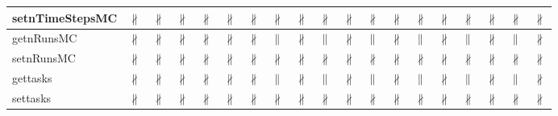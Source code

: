\documentclass[10pt]{article}
\begin{document}
\begin{longtable}{|l|l|l|l|l|l|l|l|l|l|l|l|l|l|l|l|l|l|l|}
\hline
setnTimeStepsMC&{\color{BrickRed}$\nparallel$}&{\color{BrickRed}$\nparallel$}&{\color{BrickRed}$\nparallel$}&{\color{BrickRed}$\nparallel$}&{\color{BrickRed}$\nparallel$}&{\color{BrickRed}$\nparallel$}&{\color{BrickRed}$\nparallel$}&{\color{BrickRed}$\nparallel$}&{\color{BrickRed}$\nparallel$}&{\color{BrickRed}$\nparallel$}&{\color{BrickRed}$\nparallel$}&{\color{BrickRed}$\nparallel$}&{\color{BrickRed}$\nparallel$}&{\color{BrickRed}$\nparallel$}&{\color{BrickRed}$\nparallel$}&{\color{BrickRed}$\nparallel$}&{\color{BrickRed}$\nparallel$}&{\color{BrickRed}$\nparallel$}\\
\hline
getnRunsMC&{\color{BrickRed}$\nparallel$}&{\color{BrickRed}$\nparallel$}&{\color{BrickRed}$\nparallel$}&{\color{BrickRed}$\nparallel$}&{\color{BrickRed}$\nparallel$}&{\color{BrickRed}$\nparallel$}&{\color{blue}$\parallel$}&{\color{BrickRed}$\nparallel$}&{\color{blue}$\parallel$}&{\color{BrickRed}$\nparallel$}&{\color{blue}$\parallel$}&{\color{BrickRed}$\nparallel$}&{\color{blue}$\parallel$}&{\color{BrickRed}$\nparallel$}&{\color{blue}$\parallel$}&{\color{BrickRed}$\nparallel$}&{\color{blue}$\parallel$}&{\color{BrickRed}$\nparallel$}\\
\hline
setnRunsMC&{\color{BrickRed}$\nparallel$}&{\color{BrickRed}$\nparallel$}&{\color{BrickRed}$\nparallel$}&{\color{BrickRed}$\nparallel$}&{\color{BrickRed}$\nparallel$}&{\color{BrickRed}$\nparallel$}&{\color{BrickRed}$\nparallel$}&{\color{BrickRed}$\nparallel$}&{\color{BrickRed}$\nparallel$}&{\color{BrickRed}$\nparallel$}&{\color{BrickRed}$\nparallel$}&{\color{BrickRed}$\nparallel$}&{\color{BrickRed}$\nparallel$}&{\color{BrickRed}$\nparallel$}&{\color{BrickRed}$\nparallel$}&{\color{BrickRed}$\nparallel$}&{\color{BrickRed}$\nparallel$}&{\color{BrickRed}$\nparallel$}\\
\hline
gettasks&{\color{BrickRed}$\nparallel$}&{\color{BrickRed}$\nparallel$}&{\color{BrickRed}$\nparallel$}&{\color{BrickRed}$\nparallel$}&{\color{BrickRed}$\nparallel$}&{\color{BrickRed}$\nparallel$}&{\color{blue}$\parallel$}&{\color{BrickRed}$\nparallel$}&{\color{blue}$\parallel$}&{\color{BrickRed}$\nparallel$}&{\color{blue}$\parallel$}&{\color{BrickRed}$\nparallel$}&{\color{blue}$\parallel$}&{\color{BrickRed}$\nparallel$}&{\color{blue}$\parallel$}&{\color{BrickRed}$\nparallel$}&{\color{blue}$\parallel$}&{\color{BrickRed}$\nparallel$}\\
\hline
settasks&{\color{BrickRed}$\nparallel$}&{\color{BrickRed}$\nparallel$}&{\color{BrickRed}$\nparallel$}&{\color{BrickRed}$\nparallel$}&{\color{BrickRed}$\nparallel$}&{\color{BrickRed}$\nparallel$}&{\color{BrickRed}$\nparallel$}&{\color{BrickRed}$\nparallel$}&{\color{BrickRed}$\nparallel$}&{\color{BrickRed}$\nparallel$}&{\color{BrickRed}$\nparallel$}&{\color{BrickRed}$\nparallel$}&{\color{BrickRed}$\nparallel$}&{\color{BrickRed}$\nparallel$}&{\color{BrickRed}$\nparallel$}&{\color{BrickRed}$\nparallel$}&{\color{BrickRed}$\nparallel$}&{\color{BrickRed}$\nparallel$}\\

\end{longtable}
\end{document}
